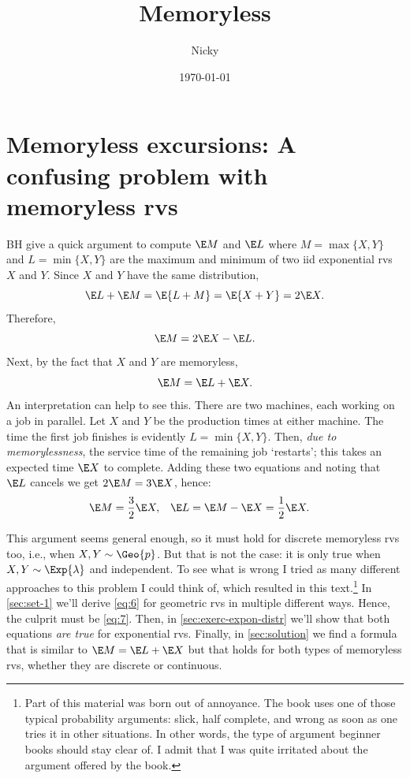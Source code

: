 \documentclass[a4paper]{article}
\author{Nicky}
\date{\today}
\title{Memoryless}
\begin{document}
\maketitle
\tableofcontents

\section{Memoryless excursions: A confusing problem with memoryless rvs}
\label{sec:org1720d23}
\label{sec:memoryl-exerc-conf}
BH give a quick argument to compute \(\E M\) and \(\E L\) where
\(M=\max\{X,Y\}\)  and \(L=\min\{X,Y\}\) are the maximum and minimum of two iid exponential rvs \(X\) and \(Y\).
Since  \(X\) and \(Y\)  have the same distribution,
\begin{equation*}
\E L + \E M = \E{L+M}=\E{X+Y} = 2\E X.
\end{equation*}
Therefore,
\begin{equation}
\label{eq:6}
\E M = 2\E X - \E L.
\end{equation}
Next, by the fact that  \(X\) and \(Y\) are memoryless,
\begin{equation}
\label{eq:7}
\E M = \E L  + \E X.
\end{equation}
An interpretation can help to see this. There are two machines, each working on a job in parallel.
Let \(X\) and \(Y\) be the production times at either machine.
The time the first job finishes is evidently \(L=\min\{X, Y\}\).
Then,  \emph{due to memorylessness}, the service time of the remaining job `restarts'; this takes an expected time \(\E X\) to complete.
Adding these two equations and noting that \(\E L\) cancels we get \(2\E M = 3 \E X\), hence:
\begin{align}
\label{eq:35}
\E M &= \frac 3 2 \E X, & \E L &= \E M - \E X = \frac 1 2 \E X.
\end{align}

This argument seems general enough, so it must hold for discrete memoryless rvs too, i.e., when \(X, Y \sim \Geo{p}\). But that is not the case: it is only true when \(X, Y \sim \Exp{\lambda}\) and independent. To see what is wrong I tried as many different approaches to this problem I could think of, which  resulted in this text.\footnote{Part of this material was born out of annoyance.  The  book uses one of those typical probability arguments:  slick, half complete, and wrong as soon as one tries it in other situations. In other words, the type of argument beginner books should stay clear of. I admit that I was quite irritated about the argument offered by the book.} In \cref{sec:set-1} we'll derive \cref{eq:6}  for geometric rvs in multiple  different ways.
Hence, the culprit must be \cref{eq:7}. Then, in  \cref{sec:exerc-expon-distr} we'll show that both equations  \emph{are true} for exponential rvs.
Finally, in \cref{sec:solution} we find a formula that is similar to \(\E M = \E L + \E X\) but that holds for both types of memoryless rvs, whether they are discrete or continuous.
\end{document}
